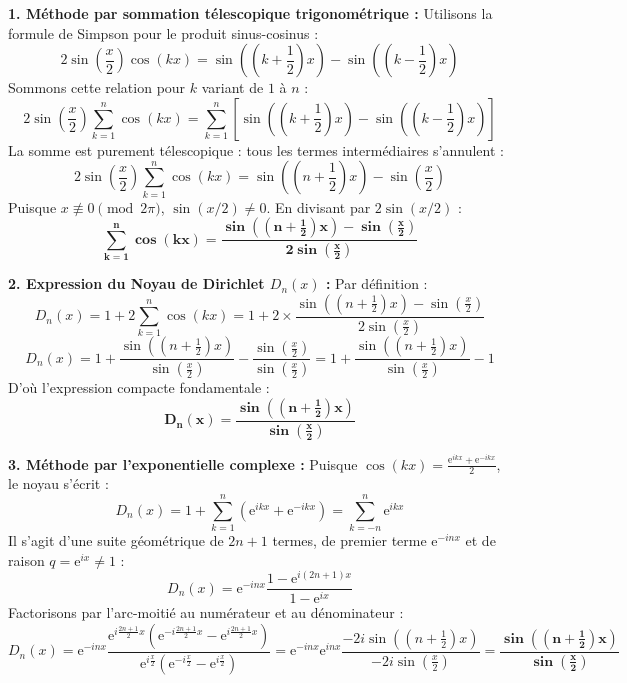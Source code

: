 \documentclass[11pt,a4paper]{article}
\newcommand{\e}{\mathrm{e}}
\begin{document}
\begin{correctionbox}
\textbf{1. Méthode par sommation télescopique trigonométrique :}
Utilisons la formule de Simpson pour le produit sinus-cosinus :
\[
2\sin\left(\frac{x}{2}\right)\cos(kx) = \sin\left(\left(k+\frac{1}{2}\right)x\right) - \sin\left(\left(k-\frac{1}{2}\right)x\right)
\]
Sommons cette relation pour $k$ variant de $1$ à $n$ :
\[
2\sin\left(\frac{x}{2}\right) \sum_{k=1}^n \cos(kx) = \sum_{k=1}^n \left[ \sin\left(\left(k+\frac{1}{2}\right)x\right) - \sin\left(\left(k-\frac{1}{2}\right)x\right) \right]
\]
La somme est purement télescopique : tous les termes intermédiaires s'annulent :
\[
2\sin\left(\frac{x}{2}\right) \sum_{k=1}^n \cos(kx) = \sin\left(\left(n+\frac{1}{2}\right)x\right) - \sin\left(\frac{x}{2}\right)
\]
Puisque $x \not\equiv 0 \pmod{2\pi}$, $\sin(x/2) \neq 0$. En divisant par $2\sin(x/2)$ :
\[
\mathbf{\sum_{k=1}^n \cos(kx) = \frac{\sin\left(\left(n+\frac{1}{2}\right)x\right) - \sin\left(\frac{x}{2}\right)}{2\sin\left(\frac{x}{2}\right)}}
\]

\textbf{2. Expression du Noyau de Dirichlet $D_n(x)$ :}
Par définition :
\[
D_n(x) = 1 + 2\sum_{k=1}^n \cos(kx) = 1 + 2 \times \frac{\sin\left(\left(n+\frac{1}{2}\right)x\right) - \sin\left(\frac{x}{2}\right)}{2\sin\left(\frac{x}{2}\right)}
\]
\[
D_n(x) = 1 + \frac{\sin\left(\left(n+\frac{1}{2}\right)x\right)}{\sin\left(\frac{x}{2}\right)} - \frac{\sin\left(\frac{x}{2}\right)}{\sin\left(\frac{x}{2}\right)} = 1 + \frac{\sin\left(\left(n+\frac{1}{2}\right)x\right)}{\sin\left(\frac{x}{2}\right)} - 1
\]
D'où l'expression compacte fondamentale :
\[
\mathbf{D_n(x) = \frac{\sin\left(\left(n+\frac{1}{2}\right)x\right)}{\sin\left(\frac{x}{2}\right)}}
\]

\textbf{3. Méthode par l'exponentielle complexe :}
Puisque $\cos(kx) = \frac{\e^{ikx} + \e^{-ikx}}{2}$, le noyau s'écrit :
\[
D_n(x) = 1 + \sum_{k=1}^n (\e^{ikx} + \e^{-ikx}) = \sum_{k=-n}^n \e^{ikx}
\]
Il s'agit d'une suite géométrique de $2n+1$ termes, de premier terme $\e^{-inx}$ et de raison $q = \e^{ix} \neq 1$ :
\[
D_n(x) = \e^{-inx} \frac{1 - \e^{i(2n+1)x}}{1 - \e^{ix}}
\]
Factorisons par l'arc-moitié au numérateur et au dénominateur :
\[
D_n(x) = \e^{-inx} \frac{\e^{i\frac{2n+1}{2}x} \left( \e^{-i\frac{2n+1}{2}x} - \e^{i\frac{2n+1}{2}x} \right)}{\e^{i\frac{x}{2}} \left( \e^{-i\frac{x}{2}} - \e^{i\frac{x}{2}} \right)} = \e^{-inx} \e^{inx} \frac{-2i \sin\left(\left(n+\frac{1}{2}\right)x\right)}{-2i \sin\left(\frac{x}{2}\right)} = \mathbf{\frac{\sin\left(\left(n+\frac{1}{2}\right)x\right)}{\sin\left(\frac{x}{2}\right)}}
\]
\end{correctionbox}
\end{document}
